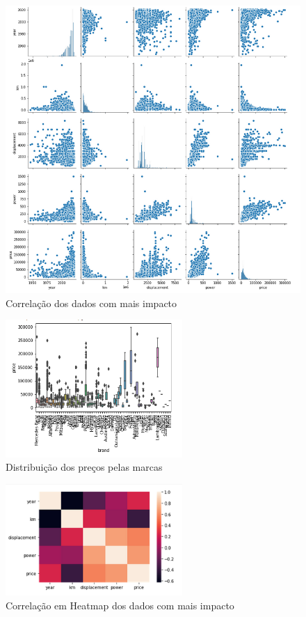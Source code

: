 \documentclass[a4paper]{report}
\begin{document}
\begin{figure}[H]
    \centering
    \includegraphics[width=\textwidth]{images/correlation.png}
    \caption{Correlação dos dados com mais impacto}
\end{figure}

\begin{figure}[H]
    \centering
    \includegraphics[width=0.6\textwidth]{images/price_brands.png}
    \caption{Distribuição dos preços pelas marcas}
\end{figure}

\begin{figure}[H]
    \centering
    \includegraphics[width=0.6\textwidth]{images/heatmap.png}
    \caption{Correlação em Heatmap dos dados com mais impacto}
\end{figure}
\end{document}
